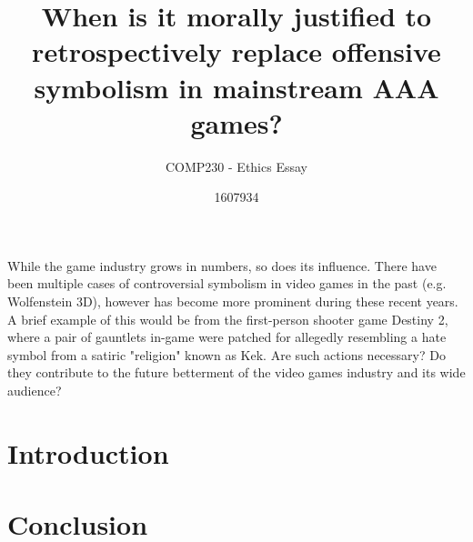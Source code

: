 \documentclass{scrartcl}
\title{When is it morally justified to retrospectively replace offensive symbolism in mainstream AAA games?}
\subtitle{COMP230 - Ethics Essay}
\author{1607934}
\begin{document}
\maketitle

\abstract{} 
While the game industry grows in numbers, so does its influence. There have been multiple cases of controversial symbolism in video games in the past (e.g. Wolfenstein 3D), however has become more prominent during these recent years. A brief example of this would be from the first-person shooter game Destiny 2, where a pair of gauntlets in-game were patched for allegedly resembling a hate symbol from a satiric "religion" known as Kek. Are such actions necessary? Do they contribute to the future betterment of the video games industry and its wide audience?

\section{Introduction}



\section{}



\section{}



\section{}



\section{Conclusion}





\end{document}
